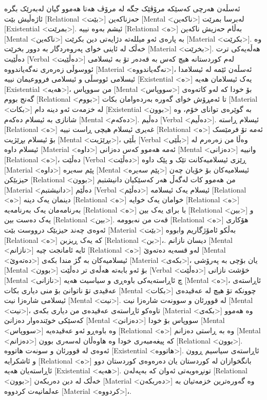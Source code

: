 ئەسڵەن هەرچی کەسێکە مرۆڤێک جگە لە مرۆڤ هەتا هەموو گیان لەبەرێک بگرە ئاژەڵیش بێت [Relational <بێت>] حەزناکەین [Mental <ناکەین>] لەبرسا بمرێت [Existential <بمرێت>]. ئیشم بەوە نییە [Relational <ە>] بەڵام حەزیش ناکەین [Mental <ناکەین>] بە پارەی ئەو میللەتە دژایەتی دین بکرێت [Material <بکرێت>]. وە خەڵک لە ئاینی خوای پەروەردگار بە دوور بخرێت [Material <بخرێت>]. هەڵەیەکی ترت دەڵێیت [Verbal <دەڵێیت>] لەم کوردستانە هیچ کەس بە قەدەر تۆ بە ئیسلامی ئووسوڵی زەرەری نەگەیاندووە [Material <نەگەیاندووە>]، ئەسڵەن ئێمە لە ئیسلامدا ئیسلامی ئووسڵی و ئیسلامی فرووعیمان نییە [Existential <ە>] یەک ئیسلامان هەیە [Existential <هەیە>]، من سووپاس [Mental <سووپاس>] بۆ خودا کە لەو کاتەوەی گەنج بووم [Relational <بووم>] تا ئەمڕۆش خوای گەورە بەردەوامان بکات [Material <بکات>] لە خزمەت ئەو دینە دام [Existential <بوون>] بە گوێرەی توانای خۆم، وە شانازی بە ئیسلام دەکەم [Mental <دەکەم>].
دەڵیم [Verbal <دەڵیم>].
ئیسلام ڕاستە [Relational <ە>] غەیری ئیسلام هیچی ڕاست نییە [Relational <ە>] ئەمە تۆ فرمێسک بۆ ئیسلام بڕێژیت [Mental <بڕێژیت>]، بڵێی [Verbal <بڵێی>] وەڵا من زەرەرم لە ئیسلام داوە [Material <داوە>] ئەمە هەموو کەس دەزانی [Mental <دەزانی>] وانییە [Relational <ە>]، دەڵێت [Verbal <دەڵێت>] ڕێزی ئیسلامیەکانت تێک و پێک داوە [Material <داوە>] پێم سەیرە [Mental <پێم سەیرە>] ئیسلامیەکان بۆ خۆیان چەن حیزبێکن [Relational <بوون>] من هەموو کات لەگەڵ هەر کەسێکیان دانیشتبم [Material <دانیشتبم>] دەڵێم [Verbal <دەڵێم>] ئیسلام یەک ئیسلامە [Relational <ە>] دینمان یەک دینە [Relational <ە>] خوامان یەک خوایە [Relational <ە>] بەرنامەمان یەک بەرنامەیە [Relational <ە>] با برای یەک بین [Relational <بین>] و یەک دەست بین [Relational <بین>]. قەت من نەبوومە [Relational <ە>] هۆکاری ئەوەی چەند حیزبێک درووست بێت [Material <بێت>] بەڵکو ئامۆژگاریم وابووە [Relational <ە>] کە یەک ڕیزبن [Relational <بن>]،.
دیسان نازانم [Mental <نازانم>] ئایە ئامانجت چیە [Relational <ە>] لەو قسەیە دەتەوێ [Mental <دەتەوێ>] ئیسلامیەکان بە گژ مندا بکەی [Material <بکەی>]، یان بۆچی بە پەرۆشی [Mental <بوون>] بۆ ئەو بابەتە هەڵەی تر دەڵێت [Verbal <دەڵێت>] خۆشت نازانی [Mental <نازانی>] چ ئاڕاستەیەکی باوەڕی و سیاسیت هەیە [Mental <ە>]، ئاڕاستەی عەقیدی تۆ ناتوانێ بۆ منی دیاری بکات [Mental <بکات>] چوونکە تۆ هیچ لە عەقیدەی ئیسلامی شارەزا نیت [Mental <نیت>]. لە قوورئان و سوونەت شارەزا نیت [Mental <نیت>]، تاوەکو ئاڕاستەی عەقیدەی من دیاری بکەی [Material <بکەی>] وە هەموو کەسێکی خوێندەوار دەزانێ [Mental <دەزانێ>] سووپاس بۆ خودا [Mental <سووپاس>] وە باوەڕو ئەو عەقیدەیە [Relational <ە>] وە بە ڕاستی دەزانم [Mental <دەزانم>] کە پیغەمبەری خودا وە هاوەڵان لەسەری بوون [Relational <بوون>]. ئەوەی لە قوورئان و سونەت هاتووە [Existential <هاتووە>]. ئاڕاستەی سیاسیم ڕوون و ئاشکرایە [Relational <ە>] بانگخوازان لە کوردستان یان دەرەوەی کوردستان دوو ئاڕاستەیان هەیە [Existential <هەیە>]. تونڕەویەتی ئەوان کە بەپەلەن [Relational <بوون>] خەڵک لە دین دەربکەن [Material <دەربکەن>] وە گەورەترین خزمەتیان بە عەلمانیەت کردووە [Material <کردووە>]،.
